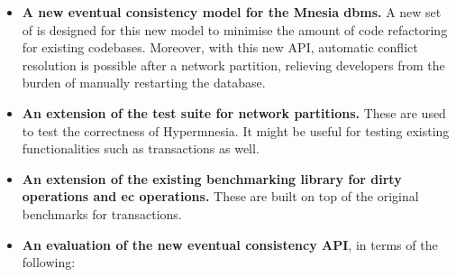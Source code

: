 \begin{itemize}
  \item \textbf{A new eventual consistency model for the Mnesia \acrshort{dbms}.}
  A new set of  is designed for this new model to minimise the 
  amount of code refactoring for existing codebases. Moreover, with this new API, 
  automatic conflict resolution is
  possible after a network partition, relieving developers from the burden
  of manually restarting the database.
  \item \textbf{An extension of the test suite for network partitions.}
  These are used to test the correctness of Hypermnesia. It might
  be useful for testing existing functionalities such as transactions as well.
  \item \textbf{An extension of the existing benchmarking library for dirty operations
  and \acrshort{ec} operations.} These are built on top of the original benchmarks 
  for transactions.
  \item \textbf{An evaluation of the new eventual consistency API}, in terms of the
  following:

\end{itemize}

